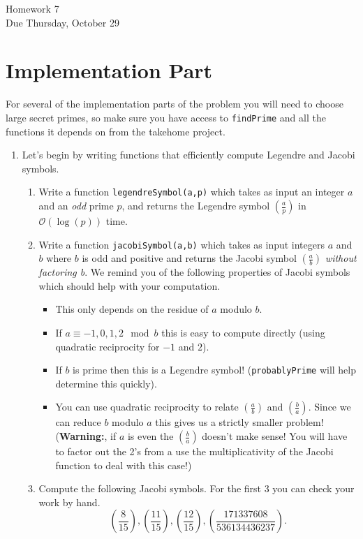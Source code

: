\documentclass[11pt]{article}
\newcommand{\cO}{\mathcal{O}}
\begin{document}
\begin{center}
\Large {Homework 7}\\
\small {Due Thursday, October 29}
\end{center}
\section*{Implementation Part}
For several of the implementation parts of the problem you will need to choose large secret primes, so make sure you have access to \verb|findPrime| and all the functions it depends on from the takehome project.
\begin{enumerate}
  \item{
  Let's begin by writing functions that efficiently compute Legendre and Jacobi symbols.
  \begin{enumerate}
    \item{
    Write a function \verb|legendreSymbol(a,p)| which takes as input an integer $a$ and an \textit{odd} prime $p$, and returns the Legendre symbol $\left(\frac{a}{p}\right)$ in $\cO(\log(p))$ time.
    }
    \item{
    Write a function \verb|jacobiSymbol(a,b)| which takes as input integers $a$ and $b$ where $b$ is odd and positive and returns the Jacobi symbol $\left(\frac{a}{b}\right)$ \textit{without factoring b}.  We remind you of the following properties of Jacobi symbols which should help with your computation.
    \begin{itemize}
      \item{
      This only depends on the residue of $a$ modulo $b$.
      }
      \item{
      If $a\equiv -1,0,1,2\mod b$ this is easy to compute directly (using quadratic reciprocity for $-1$ and $2$).
      }
      \item{
      If $b$ is prime then this is a Legendre symbol!  (\verb|probablyPrime| will help determine this quickly).
      }
      \item{
      You can use quadratic reciprocity to relate $\left(\frac{a}{b}\right)$ and $\left(\frac{b}{a}\right)$.  Since we can reduce $b$ modulo $a$ this gives us a strictly smaller problem!  (\textbf{Warning:}, if $a$ is even the $\left(\frac{b}{a}\right)$ doesn't make sense!  You will have to factor out the 2's from a use the multiplicativity of the Jacobi function to deal with this case!)
      }
    \end{itemize}
    }
    \item{
    Compute the following Jacobi symbols.  For the first 3 you can check your work by hand. \[\left(\frac{8}{15}\right),\left(\frac{11}{15}\right),\left(\frac{12}{15}\right),\left(\frac{171337608}{536134436237}\right).\]
}
\end{enumerate}}
\end{enumerate}
\end{document}
